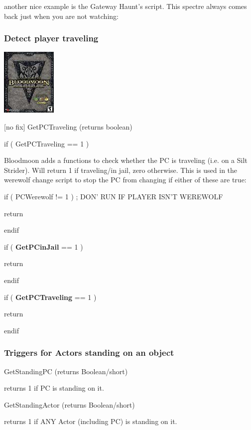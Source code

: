 \documentclass[
]{article}
\begin{document}
another nice example is the Gateway Haunt's script. This spectre always
comes back just when you are not watching:



\hypertarget{detect-player-traveling}{%
\subsubsection{Detect player traveling}\label{detect-player-traveling}}

\includegraphics{media/image7.png}

{[}no fix{]} GetPCTraveling (returns boolean)

if ( GetPCTraveling == 1 )

Bloodmoon adds a functions to check whether the PC is traveling (i.e. on
a Silt Strider). Will return 1 if traveling/in jail, zero otherwise.
This is used in the werewolf change script to stop the PC from changing
if either of these are true:

if ( PCWerewolf != 1 ) ; DON' RUN IF PLAYER ISN'T WEREWOLF

return

endif

if ( \textbf{GetPCinJail} == 1 )

return

endif

if ( \textbf{GetPCTraveling} == 1 )

return

endif

\hypertarget{triggers-for-actors-standing-on-an-object}{%
\subsubsection{Triggers for Actors standing on an
object}\label{triggers-for-actors-standing-on-an-object}}

GetStandingPC (returns Boolean/short)

returns 1 if PC is standing on it.

GetStandingActor (returns Boolean/short)

returns 1 if ANY Actor (including PC) is standing on it.
\end{document}
